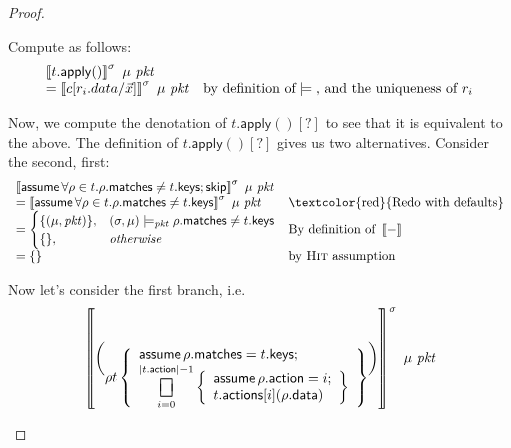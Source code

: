 \documentclass{article}
\newcommand{\pkt}{\mathit{pkt}}
\newcommand{\denote}[1]{\left\llbracket#1\right\rrbracket}
\newcommand{\matches}{\mathsf{matches}}
\newcommand{\action}{\mathsf{action}}
\newcommand{\actions}{\mathsf{actions}}
\newcommand{\keys}{\mathsf{keys}}
\newcommand{\data}{\mathsf{data}}
\newcommand{\assume}{\mathop{\mathsf{assume}}}
\newcommand{\apply}{\mathsf{apply}}
\newcommand{\choiceop}{\rotatebox[origin=c]{90}{$\sqsubset\!\!\!\sqsupset$}}
\DeclareMathOperator*{\bigchoice}{\scalerel*{\choiceop}{\sum}}
\newcommand{\SKIP}{\mathsf{skip}}
\newcommand{\satisfy}[3]{({#1,#3}) \models_{#2}}
\begin{document}
\begin{proof}
\begin{enumerate}[align=left]
\begin{enumerate}
      Compute as follows:
      \[\begin{array}{>{\displaystyle}ll}
      \denote{t.\apply()}^\sigma~\mu~\pkt \\
      = \denote{c[r_i.data/\vec x]}^\sigma~\mu~\pkt & \text{by definition of} \models \text{, and the uniqueness of }r_i  \\
      \end{array}
      \]

      Now, we compute the denotation of $t.\apply()[?]$ to see that it is equivalent to the above.
      The definition of $t.\apply()[?]$ gives us two alternatives. Consider the second, first:
      \[\begin{array}{>{\displaystyle}ll}
        \denote{\assume \forall \rho \in t. \rho.\matches \neq t.\keys;\SKIP}^\sigma~\mu~\pkt \\
        = \denote{\assume \forall \rho \in t. \rho.\matches \neq t.\keys}^\sigma~\mu~\pkt
        & \textrm{\textcolor{red}{Redo with defaults}} \\
        = \begin{cases}
          \{(\mu,\pkt)\}, & \satisfy\sigma\pkt\mu \rho.\matches \neq t.\keys \\
          \{\}, &\textit{otherwise}
        \end{cases}
        & \textrm{By definition of }\denote{-}\\
        =  \{\}
        & \textrm{by \textsc{Hit} assumption}
      \end{array}
      \]

      Now let's consider the first branch, i.e.
      \[
      \denote{\choose \rho t \left\{
        \begin{array}{>{\displaystyle}l}
          \assume \rho.\matches = t.\keys;\\
          \bigchoice_{i=0}^{|t.\action| -1}
          \left\{\begin{array}{l}
          \assume \rho.\action = i;\\
          t.\actions[i](\rho.\data)
          \end{array}\right\}
        \end{array}\right\}
      }^\sigma~\mu~\pkt\]


\end{enumerate}
\end{enumerate}
\end{proof}
\end{document}
